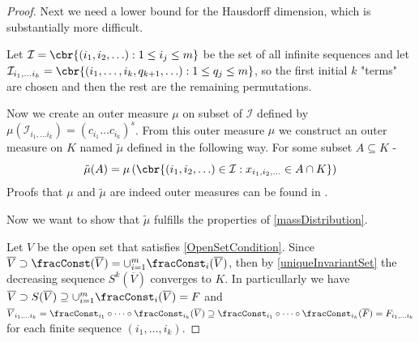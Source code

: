 \begin{proof}
	Next we need a lower bound for the Hausdorff dimension, which is substantially more difficult. 
	
	Let $\mathcal{I} = \cbr{(i_1, i_2, \ldots) : 1 \leq i_j \leq m}$ be the set of all infinite sequences and let \newline $\mathcal{I}_{i_1, \ldots i_k} = \cbr{(i_1, \ldots , i_k, q_{k+1}, \ldots ) : 1 \leq q_j \leq m}$, so the first initial $k$ "terms" are chosen and then the rest are the remaining permutations.
	
	Now we create an outer measure $\mu$ on subset of $\mathcal{I}$ defined by $\mu(\mathcal{I}_{i_1, \ldots i_k}) = (c_{i_1} \dots c_{i_k})^{s}$. From this outer measure $\mu$ we construct an outer measure on $K$ named $\tilde{\mu}$ defined in the following way. For some subset $A \subseteq K$
-	\begin{equation}
		\tilde{\mu}(A) = \mu \left(\cbr{(i_1, i_2, \ldots)\in \mathcal{I} : x_{i_1, i_2, \ldots} \in A \cap K}\right)
	\end{equation}  Proofs that $\mu$ and $\tilde{\mu}$ are indeed outer measures can be found in \cite[Section 7]{mona}.
	
	Now we want to show that $\tilde{\mu}$ fulfills the properties of \cref{massDistribution}. 
	
	Let $V$ be the open set that satisfies \cref{OpenSetCondition}.  Since $\overline{V} \supset \fracConst(\overline{V}) = \cup_{i = 1}^{m} \fracConst_{i}(\overline{V})$, then by \cref{uniqueInvariantSet} the decreasing sequence $S^{k}(\overline{V})$ converges to $K$. In particullarly we have $\overline{V} \supset S(\overline{V}) \supseteq \cup_{i = 1}^{m} \fracConst_i(\overline{V}) = F$ and $\overline{V}_{i_1, \ldots i_k} =\fracConst_{i_1} \circ \dots \circ \fracConst_{i_k}(\overline{V}) \supseteq \fracConst_{i_1} \circ \dots \circ \fracConst_{i_k}(\overline{F}) = F_{i_1, \ldots i_k}$ for each finite sequence $(i_1, \ldots, i_k)$. 
	

\end{proof}
